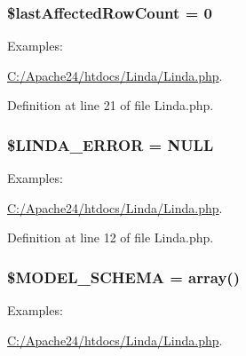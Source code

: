 \subsubsection[{\$last\+Affected\+Row\+Count}]{\setlength{\rightskip}{0pt plus 5cm}\$last\+Affected\+Row\+Count = 0\hspace{0.3cm}{\ttfamily [protected]}}\label{class_linda_a038edab690e03aff9c70a1f63c06f27e}
\begin{Desc}
\item[Examples\+: ]\par
\hyperlink{_c_1_2_apache24_2htdocs_2_linda_2_linda_8php-example}{C\+:/\+Apache24/htdocs/\+Linda/\+Linda.\+php}.\end{Desc}


Definition at line 21 of file Linda.\+php.

\hypertarget{class_linda_ab7d7da38a7a04e1f95bc46697f8d80e3}{}
\subsubsection[{\$\+L\+I\+N\+D\+A\+\_\+\+E\+R\+R\+O\+R}]{\setlength{\rightskip}{0pt plus 5cm}\$L\+I\+N\+D\+A\+\_\+\+E\+R\+R\+O\+R = N\+U\+L\+L}\label{class_linda_ab7d7da38a7a04e1f95bc46697f8d80e3}
\begin{Desc}
\item[Examples\+: ]\par
\hyperlink{_c_1_2_apache24_2htdocs_2_linda_2_linda_8php-example}{C\+:/\+Apache24/htdocs/\+Linda/\+Linda.\+php}.\end{Desc}


Definition at line 12 of file Linda.\+php.

\hypertarget{class_linda_a46c628c6bd56ec5880da2515cf352183}{}
\subsubsection[{\$\+M\+O\+D\+E\+L\+\_\+\+S\+C\+H\+E\+M\+A}]{\setlength{\rightskip}{0pt plus 5cm}\$M\+O\+D\+E\+L\+\_\+\+S\+C\+H\+E\+M\+A = array()\hspace{0.3cm}{\ttfamily [protected]}}\label{class_linda_a46c628c6bd56ec5880da2515cf352183}
\begin{Desc}
\item[Examples\+: ]\par
\hyperlink{_c_1_2_apache24_2htdocs_2_linda_2_linda_8php-example}{C\+:/\+Apache24/htdocs/\+Linda/\+Linda.\+php}.\end{Desc}


